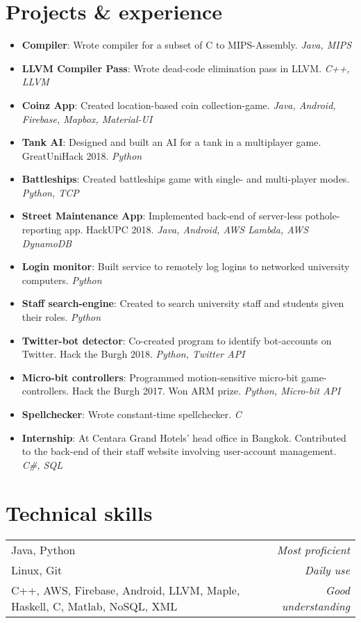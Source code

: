 \documentclass[11pt,a4paper]{article}
\begin{document}
\section*{Projects \& experience}
\begin{itemize}
    \item \textbf{Compiler}:
        Wrote compiler for a subset of C to MIPS-Assembly.
        \textit{Java, MIPS}
    \item \textbf{LLVM Compiler Pass}:
        Wrote dead-code elimination pass in LLVM.
        \textit{C++, LLVM}
    \item \textbf{Coinz App}:
        Created location-based coin collection-game.
		\textit{Java, Android, Firebase, Mapbox, Material-UI}
    \item \textbf{Tank AI}:
        Designed and built an AI for a tank in a multiplayer game. GreatUniHack 2018.
        \textit{Python}
    \item \textbf{Battleships}:
        Created battleships game with single- and multi-player modes.
        \textit{Python, TCP}
    \item \textbf{Street Maintenance App}:
        Implemented back-end of server-less pothole-reporting app. HackUPC 2018.
		\textit{Java, Android, AWS Lambda, AWS DynamoDB}
    \item \textbf{Login monitor}:
        Built service to remotely log logins to networked university computers.
        \textit{Python}
    \item \textbf{Staff search-engine}:
        Created to search university staff and students given their roles.
        \textit{Python}
    \item \textbf{Twitter-bot detector}:
        Co-created program to identify bot-accounts on Twitter. Hack the Burgh 2018.
        \textit{Python, Twitter API}
    \item \textbf{Micro-bit controllers}:
        Programmed motion-sensitive micro-bit game-controllers. Hack the Burgh 2017.
        Won ARM prize.
        \textit{Python, Micro-bit API}
    \item \textbf{Spellchecker}:
        Wrote constant-time spellchecker.
        \textit{C}
    \item \textbf{Internship}:
        At Centara Grand Hotels' head office in Bangkok.
        Contributed to the back-end of their staff website involving user-account management.
        \textit{C\#, SQL} 
\end{itemize}

\hline
\section*{Technical skills}
\begin{tabularx}{\textwidth}{X r}
    Java, Python & \textit{Most proficient} \\
    Linux, Git & \textit{Daily use} \\
    C++, AWS, Firebase, Android, LLVM, Maple, Haskell, C, Matlab, NoSQL, XML & \textit{Good understanding} \\
\end{tabularx}
\end{document}
